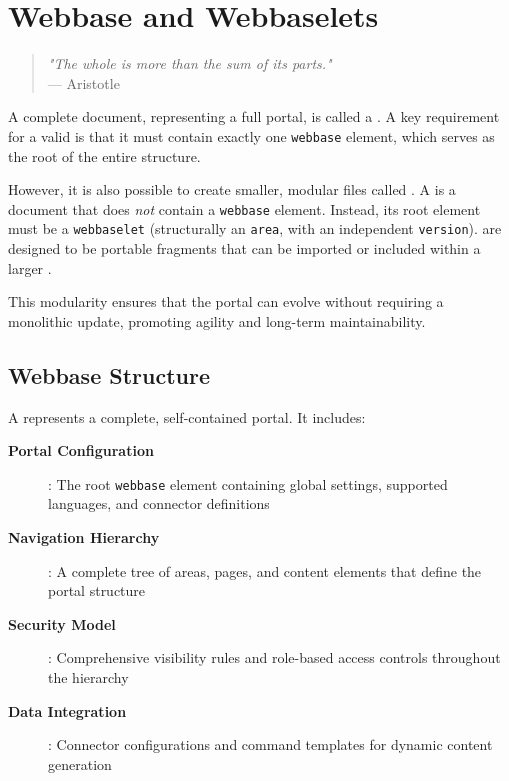 
\chapter{Webbase and Webbaselets}
\label{chap:webbaselets}

\begin{quote}
\textit{"The whole is more than the sum of its parts."} \\
— Aristotle
\end{quote}

A complete \wbol{} document, representing a full portal, is called a \textbf{\webbase{}}. A key requirement for a valid \webbase{} is that it must contain exactly one \texttt{webbase} element, which serves as the root of the entire structure.

However, it is also possible to create smaller, modular \wbol{} files called \textbf{}. A \webbaselet{} is a \wbol{} document that does \emph{not} contain a \texttt{webbase} element. Instead, its root element must be a \texttt{webbaselet} (structurally an \texttt{area}, with an independent \texttt{version}).  are designed to be portable fragments that can be imported or included within a larger \webbase{}.

This modularity ensures that the portal can evolve without requiring a monolithic update, promoting agility and long-term maintainability.

\section{Webbase Structure}
\label{sec:webbase-structure}

A \webbase{} represents a complete, self-contained portal. It includes:

\begin{description}
\item[\textbf{Portal Configuration}]: The root \texttt{webbase} element containing global settings, supported languages, and connector definitions
\item[\textbf{Navigation Hierarchy}]: A complete tree of areas, pages, and content elements that define the portal structure
\item[\textbf{Security Model}]: Comprehensive visibility rules and role-based access controls throughout the hierarchy
\item[\textbf{Data Integration}]: Connector configurations and command templates for dynamic content generation
\end{description}

